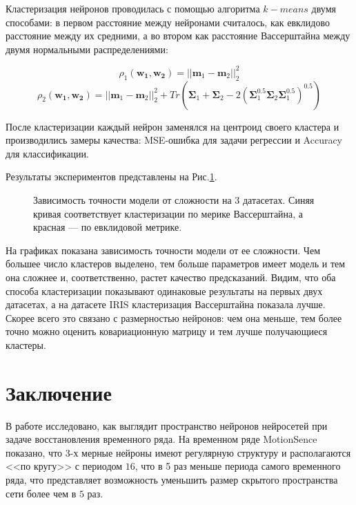 \documentclass[12pt, twoside]{article}
\begin{document}
Кластеризация нейронов проводилась с помощью алгоритма $k-means$ двумя способами: в первом расстояние между нейронами считалось, как евклидово расстояние между их средними, а во втором как расстояние Вассерштайна между двумя нормальными распределениями:

$$
\rho_1(\mathbf{w_1}, \mathbf{w_2}) = ||\mathbf{m}_1 - \mathbf{m}_2||_2^2$$
$$
\rho_2(\mathbf{w_1}, \mathbf{w_2}) = ||\mathbf{m}_1 - \mathbf{m}_2||_2^2 + Tr(\mathbf{\Sigma}_1 + \mathbf{\Sigma}_2 - 2(\mathbf{\Sigma}_1^{0.5}\mathbf{\Sigma}_2\mathbf{\Sigma}_1^{0.5})^{0.5})
$$

После кластеризации каждый нейрон заменялся на центроид своего кластера и производились замеры качества: MSE-ошибка для задачи регрессии и Accuracy для классификации.

Результаты экспериментов представлены на Рис.\ref{fg:dim_red_boot}.
\begin{figure}[!ht]
\caption{Зависимость точности модели от сложности на 3 датасетах. Синяя кривая соответствует кластеризации по мерике Вассерштайна, а красная --- по евклидовой метрике.}
\label{fg:dim_red_boot}
\end{figure}

На графиках показана зависимость точности модели от ее сложности. Чем большее число кластеров выделено, тем больше параметров имеет модель и тем она сложнее и, соответственно, растет качество предсказаний. Видим, что оба способа кластеризации показывают одинаковые результаты на первых двух датасетах, а на датасете IRIS кластеризация Вассерштайна показала лучше. Скорее всего это связано с размерностью нейронов: чем она меньше, тем более точно можно оценить ковариационную матрицу и тем лучше получающиеся кластеры.

\section{Заключение}
В работе исследовано, как выглядит пространство нейронов нейросетей при задаче восстановления временного ряда. На временном ряде MotionSence показано, что $3$-х мерные  нейроны имеют регулярную структуру и располагаются <<по кругу>> с периодом $16$, что в 5 раз меньше периода самого временного ряда, что представляет возможность уменьшить размер скрытого пространства сети более чем в $5$ раз.
\end{document}
